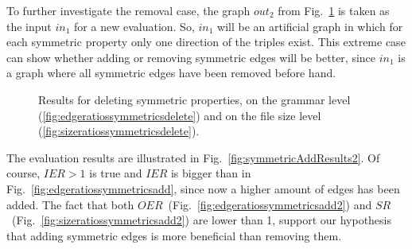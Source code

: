 To further investigate the removal case, the graph $out_2$ from Fig.~\ref{fig:symmetricDeleteResults} is taken as the input $in_1$ for a new evaluation. So, $in_1$ will be an artificial graph in which for each symmetric property only one direction of the triples exist. This extreme case can show whether adding or removing symmetric edges will be better, since $in_1$ is a graph where all symmetric edges have been removed before hand.

\begin{figure}[h]
	\centering
	\hfill 
	\caption{Results for deleting symmetric properties, on the grammar level (\ref{fig:edgeratiossymmetricsdelete}) and on the file size level (\ref{fig:sizeratiossymmetricsdelete}).}
	\label{fig:symmetricDeleteResults}
\end{figure}

The evaluation results are illustrated in Fig.~\ref{fig:symmetricAddResults2}. Of course, $IER>1$ is true and $IER$ is bigger than in Fig.~\ref{fig:edgeratiossymmetricsadd}, since now a higher amount of edges has been added. The fact that both $OER$~(Fig.~\ref{fig:edgeratiossymmetricsadd2}) and $SR$~(Fig.~\ref{fig:sizeratiossymmetricsadd2}) are lower than 1, support our hypothesis that adding symmetric edges is more beneficial than removing them.

